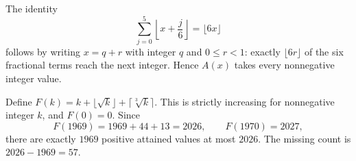 The identity
\[
\sum_{j=0}^{5}\left\lfloor x+\dfrac{j}{6}\right\rfloor=\lfloor6x\rfloor
\]
follows by writing $x=q+r$ with integer $q$ and $0\le r<1$: exactly $\lfloor6r\rfloor$ of the six fractional terms reach the next integer. Hence $A(x)$ takes every nonnegative integer value.

Define $F(k)=k+\lfloor\sqrt k\rfloor+\lceil\sqrt[3]k\rceil$. This is strictly increasing for nonnegative integer $k$, and $F(0)=0$. Since
\[
F(1969)=1969+44+13=2026,\qquad F(1970)=2027,
\]
there are exactly $1969$ positive attained values at most $2026$. The missing count is $\boxed{2026-1969=57}$.
